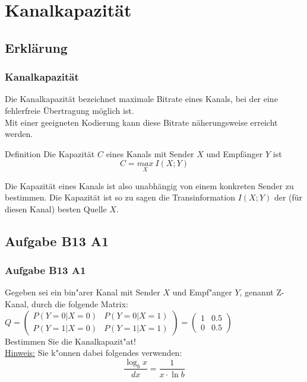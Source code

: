 




\section{Kanalkapazität}
\subsection{Erklärung}
\begin{frame}
	\frametitle{Kanalkapazität}
	Die Kanalkapazität bezeichnet maximale Bitrate eines Kanals, bei der eine fehlerfreie Übertragung möglich ist.\\
	Mit einer geeigneten Kodierung kann diese Bitrate näherungsweise erreicht werden.
	\begin{block}{Definition}
	Die Kapazität $C$ eines Kanals mit Sender $X$ und Empfänger $Y$ ist
	\begin{equation}
		C = \underset{X}{max}\ I(X;Y)
	\end{equation}
	\end{block}
	Die Kapazität eines Kanals ist also unabhängig von einem konkreten Sender zu bestimmen. Die Kapazität ist so zu sagen die Transinformation $I(X;Y)$ der (für diesen Kanal) besten Quelle $X$.
\end{frame}
\subsection{Aufgabe B13 A1}
\begin{frame}
\frametitle{Aufgabe B13 A1}
Gegeben sei ein bin"arer Kanal mit Sender $X$ und Empf"anger $Y$, genannt Z-Kanal,
durch die folgende Matrix:\\[4pt]
$Q = \left( \begin{array}{cc}
P(Y=0|X=0) & P(Y=0|X=1) \\ P(Y=1|X=0) & P(Y=1|X=1)
\end{array} \right) = \left( \begin{array}{cc}
1 & 0.5 \\ 0 & 0.5
\end{array} \right)$\\[4pt]
Bestimmen Sie die Kanalkapazit"at!\\[4pt]
\underline{Hinweis:} Sie k"onnen dabei folgendes verwenden:
\[ \frac{\log_b{x}}{dx} = \frac{1}{x \cdot \ln{b}} \]
\end{frame}


